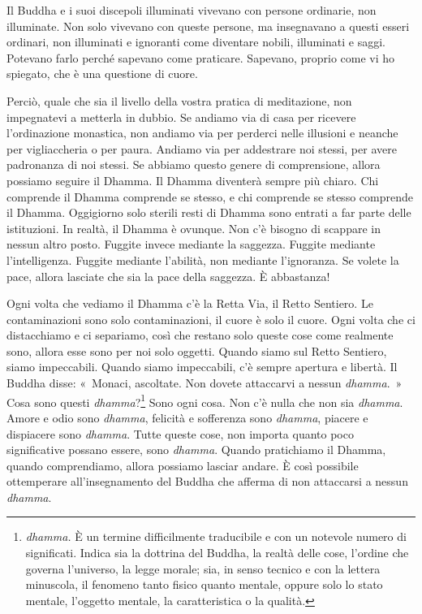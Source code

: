 Il Buddha e i suoi discepoli illuminati vivevano con persone ordinarie,
non illuminate. Non solo vivevano con queste persone, ma insegnavano a
questi esseri ordinari, non illuminati e ignoranti come diventare
nobili, illuminati e saggi. Potevano farlo perché sapevano come
praticare. Sapevano, proprio come vi ho spiegato, che è una questione di
cuore.

Perciò, quale che sia il livello della vostra pratica di meditazione,
non impegnatevi a metterla in dubbio. Se andiamo via di casa per
ricevere l'ordinazione monastica, non andiamo via per perderci nelle
illusioni e neanche per vigliaccheria o per paura. Andiamo via per
addestrare noi stessi, per avere padronanza di noi stessi. Se abbiamo
questo genere di comprensione, allora possiamo seguire il Dhamma. Il
Dhamma diventerà sempre più chiaro. Chi comprende il Dhamma comprende se
stesso, e chi comprende se stesso comprende il Dhamma. Oggigiorno solo
sterili resti di Dhamma sono entrati a far parte delle istituzioni. In
realtà, il Dhamma è ovunque. Non c'è bisogno di scappare in nessun altro
posto. Fuggite invece mediante la saggezza. Fuggite mediante
l'intelligenza. Fuggite mediante l'abilità, non mediante l'ignoranza. Se
volete la pace, allora lasciate che sia la pace della saggezza. È
abbastanza!

Ogni volta che vediamo il Dhamma c'è la Retta Via, il Retto Sentiero. Le
contaminazioni sono solo contaminazioni, il cuore è solo il cuore. Ogni
volta che ci distacchiamo e ci separiamo, così che restano solo queste
cose come realmente sono, allora esse sono per noi solo oggetti. Quando
siamo sul Retto Sentiero, siamo impeccabili. Quando siamo impeccabili,
c'è sempre apertura e libertà. Il Buddha disse: «~Monaci, ascoltate. Non
dovete attaccarvi a nessun \emph{dhamma}.~» Cosa sono questi
\emph{dhamma}?\footnote{\emph{dhamma.} È un termine
  difficilmente traducibile e con un notevole numero di significati.
  Indica sia la dottrina del Buddha, la realtà delle cose, l'ordine che
  governa l'universo, la legge morale; sia, in senso tecnico e con la
  lettera minuscola, il fenomeno tanto fisico quanto mentale, oppure
  solo lo stato mentale, l'oggetto mentale, la caratteristica o la
  qualità.} Sono ogni cosa. Non c'è nulla che non sia \emph{dhamma}.
Amore e odio sono \emph{dhamma}, felicità e sofferenza sono
\emph{dhamma}, piacere e dispiacere sono \emph{dhamma}. Tutte queste
cose, non importa quanto poco significative possano essere, sono
\emph{dhamma}. Quando pratichiamo il Dhamma, quando comprendiamo, allora
possiamo lasciar andare. È così possibile ottemperare all'insegnamento
del Buddha che afferma di non attaccarsi a nessun \emph{dhamma}.

